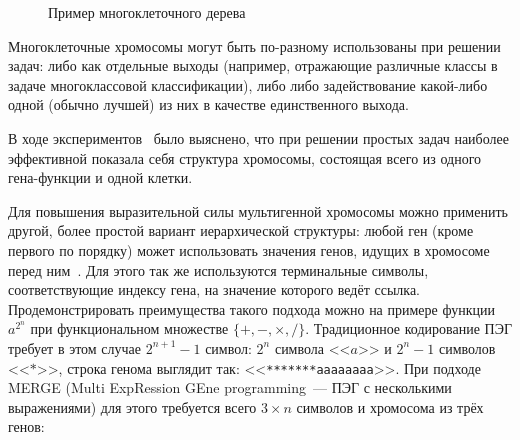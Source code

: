 \begin{figure} [h]
  \center
  \caption{Пример многоклеточного дерева}
  \label{img:GEP_ADF_sample}
\end{figure}

Многоклеточные хромосомы могут быть по-разному использованы при решении задач: либо как отдельные выходы (например, отражающие различные классы в задаче многоклассовой классификации), либо либо задействование какой-либо одной (обычно лучшей) из них в качестве единственного выхода.

В ходе экспериментов~\cite{Ferreira:2006:GSP} было выяснено, что при решении простых задач наиболее эффективной показала себя структура хромосомы, состоящая всего из одного гена-функции и одной клетки.

Для повышения выразительной силы мультигенной хромосомы можно применить другой, более простой вариант иерархической структуры: любой ген (кроме первого по порядку) может использовать значения генов, идущих в хромосоме перед ним~\cite{Dai:2008:MNE:1473243.1473311}. Для этого так же используются терминальные символы, соответствующие индексу гена, на значение которого ведёт ссылка. Продемонстрировать преимущества такого подхода можно на примере функции $a^{2^n}$ при функциональном множестве $\{+, -, \times, /\}$. Традиционное кодирование ПЭГ требует в этом случае $2^{n+1} - 1$ символ: $2^n$ символа <<$a$>> и $2^n - 1$ символов <<$*$>>, строка генома выглядит так: <<\verb|*******aaaaaaaa|>>. При подходе MERGE (Multi ExpRession GEne programming~--- ПЭГ с несколькими выражениями) для этого требуется всего $3 \times n$ символов и хромосома из трёх генов:

